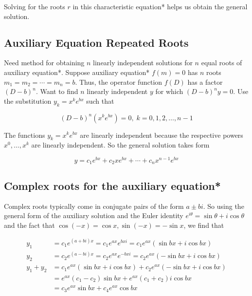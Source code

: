 Solving for the roots $r$ in this characteristic equation* helps us obtain the general solution.

\subsection{Auxiliary Equation Repeated Roots}

Need method for obtaining $n$ linearly independent solutions for $n$ equal roots of auxiliary equation*.
Suppose auxiliary equation* $f(m)=0$ has $n$ roots $m_1=m_2=\cdots=m_n=b$.
Thus, the operator function $f(D)$ has a factor $(D-b)^n$. Want to find $n$ linearly independent $y$ for which $(D-b)^ny=0$.
Use the substitution $y_k=x^ke^{bx}$ such that

\begin{equation*}
    (D-b)^n(x^ke^{bx})=0,\;k=0,1,2,\ldots,n-1
\end{equation*}

The functions $y_k=x^ke^{bx}$ are linearly independent because the respective powers $x^0,\ldots,x^k$ are linearly independent.
So the general solution takes form

\begin{equation*}
    y=c_1e^{bx}+c_2xe^{bx}+\cdots+c_nx^{n-1}e^{bx}
\end{equation*}

\subsection{Complex roots for the auxiliary equation*}

Complex roots typically come in conjugate pairs of the form $a\pm bi$.
So using the general form of the auxiliary solution and the Euler identity $e^{i\theta}=\sin\theta + i\cos\theta$ and the fact that $\cos(-x)=\cos x, \sin(-x)=-\sin x$, we find that

\begin{align*}
    y_1&=c_1e^{(a+bi)x}=c_1e^{ax}e^{bxi}=c_1e^{ax}\left(\sin bx + i\cos bx\right)\\
    y_2&=c_2e^{(a-bi)x}=c_2e^{ax}e^{-bxi}=c_2e^{ax}\left(-\sin bx + i\cos bx\right)\\
    y_1+y_2&=c_1e^{ax}\left(\sin bx + i\cos bx\right)+c_2e^{ax}\left(-\sin bx + i\cos bx\right)\\
    &=e^{ax}(c_1-c_2)\sin bx + e^{ax}(c_1+c_2)i\cos bx\\
    &=c_3e^{ax}\sin bx + c_4e^{ax}\cos bx
\end{align*}

